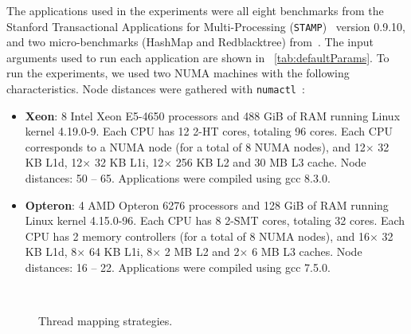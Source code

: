 The applications used in the experiments were all eight benchmarks from the Stanford Transactional Applications for Multi-Processing (\texttt{STAMP})~\cite{STAMP} version 0.9.10, and two micro-benchmarks (HashMap and Redblacktree) from~\cite{Diegues:2014:2}. The input arguments used to run each application are shown in \tablename~\ref{tab:defaultParams}. To run the experiments, we used two NUMA machines with the following characteristics. Node distances were gathered with \texttt{numactl}~\cite{libnuma}:
\begin{itemize}
	\item \textbf{Xeon}: 8 Intel Xeon E5-4650 processors and 488 GiB of RAM running Linux kernel 4.19.0-9. Each CPU has 12 2-HT cores, totaling 96 cores. Each CPU corresponds to a NUMA node (for a total of 8 NUMA nodes), and 12$\times$ 32 KB L1d, 12$\times$ 32 KB L1i, 12$\times$ 256 KB L2 and 30 MB L3 cache. Node distances: 50 -- 65. Applications were compiled using gcc 8.3.0.
	
	\item \textbf{Opteron}: 4 AMD Opteron 6276 processors and 128 GiB of RAM running Linux kernel 4.15.0-96. Each CPU has 8 2-SMT cores, totaling 32 cores. Each CPU has 2 memory controllers (for a total of 8 NUMA nodes), and 16$\times$ 32 KB L1d, 8$\times$ 64 KB L1i, 8$\times$ 2 MB L2 and 2$\times$ 6 MB L3 caches. Node distances: 16 -- 22. Applications were compiled using gcc 7.5.0.
\end{itemize}

\begin{figure}[!bt]
	\centering
\\
	\caption{Thread mapping strategies.}
	\label{fig:MappingStrategy}
\end{figure}

